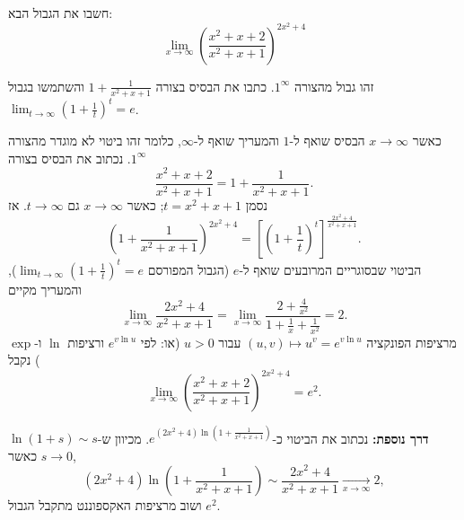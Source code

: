 
\begin{question}
חשבו את הגבול הבא:
\[ \lim_{x\to\infty}\left(\frac{x^2+x+2}{x^2+x+1}\right)^{2x^2+4} \]
\end{question}

\begin{hint}
זהו גבול מהצורה $1^\infty$. כתבו את הבסיס בצורה $1+\frac{1}{x^2+x+1}$ והשתמשו בגבול $\lim_{t\to\infty}\left(1+\frac1t\right)^t=e$.
\end{hint}

\begin{solution}
כאשר $x\to\infty$ הבסיס שואף ל-$1$ והמעריך שואף ל-$\infty$, כלומר זהו ביטוי לא מוגדר מהצורה $1^\infty$.
נכתוב את הבסיס בצורה
\[ \frac{x^2+x+2}{x^2+x+1} = 1+\frac{1}{x^2+x+1}. \]
נסמן $t=x^2+x+1$; כאשר $x\to\infty$ גם $t\to\infty$. אז
\[ \left(1+\frac{1}{x^2+x+1}\right)^{2x^2+4} = \left[\left(1+\frac1t\right)^{t}\right]^{\frac{2x^2+4}{x^2+x+1}}. \]
הביטוי שבסוגריים המרובעים שואף ל-$e$ (הגבול המפורסם $\lim_{t\to\infty}(1+\frac1t)^t=e$), והמעריך מקיים
\[ \lim_{x\to\infty}\frac{2x^2+4}{x^2+x+1} = \lim_{x\to\infty}\frac{2+\frac{4}{x^2}}{1+\frac1x+\frac1{x^2}} = 2. \]
מרציפות הפונקציה $(u,v)\mapsto u^v=e^{v\ln u}$ עבור $u>0$ (או: לפי $e^{v\ln u}$ ורציפות $\ln$ ו-$\exp$) נקבל
\[ \lim_{x\to\infty}\left(\frac{x^2+x+2}{x^2+x+1}\right)^{2x^2+4} = e^{2}. \]

\textbf{דרך נוספת:} נכתוב את הביטוי כ-$e^{(2x^2+4)\ln\left(1+\frac{1}{x^2+x+1}\right)}$. מכיוון ש-$\ln(1+s)\sim s$ כאשר $s\to0$,
\[ (2x^2+4)\ln\left(1+\frac{1}{x^2+x+1}\right) \sim \frac{2x^2+4}{x^2+x+1}\xrightarrow[x\to\infty]{}2, \]
ושוב מרציפות האקספוננט מתקבל הגבול $\boxed{e^2}$.
\end{solution}
